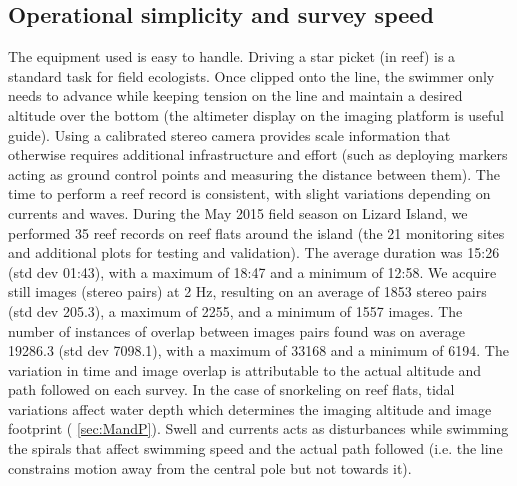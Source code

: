 \subsection{Operational simplicity and survey speed}
The equipment used is easy to handle. Driving a star picket (in reef) is a standard task for field ecologists. Once clipped onto the line, the swimmer only needs to advance while keeping tension on the line and maintain a desired altitude over the bottom (the altimeter display on the imaging platform is useful guide).
Using a calibrated stereo camera provides scale information that otherwise requires additional infrastructure and effort (such as deploying markers acting as ground control points and measuring the distance between them). 
The time to perform a reef record is consistent, with slight variations depending on currents and waves. During the May 2015 field season on Lizard Island, we performed 35 reef records on reef flats around the island (the 21 monitoring sites and additional plots for testing and validation). The average duration was 15:26 (std dev 01:43), with a maximum of 18:47 and a minimum of 12:58. We acquire still images (stereo pairs) at 2 Hz, resulting on an average of 1853 stereo pairs (std dev 205.3), a maximum of 2255, and a minimum of 1557 images. The number of instances of overlap between images pairs found was on average 19286.3 (std dev 7098.1), with a maximum of 33168 and a minimum of 6194. The variation in time and image overlap is attributable to the actual altitude and path followed on each survey. In the case of snorkeling on reef flats, tidal variations affect water depth which determines the imaging altitude and image footprint ( \ref{sec:MandP}). Swell and currents acts as disturbances while swimming the spirals that affect swimming speed and the actual path followed (i.e. the line constrains motion away from the central pole but not towards it). 





